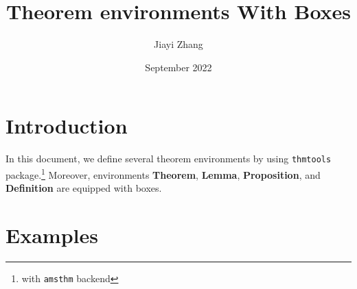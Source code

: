 \documentclass{article}
\title{Theorem environments With Boxes}
\author{Jiayi Zhang}
\date{September 2022}
\begin{document}
\maketitle

\section{Introduction}
In this document, we define several theorem environments by using 
\texttt{thmtools} package.\footnote{with \texttt{amsthm} backend} Moreover, environments \textbf{Theorem}, \textbf{Lemma}, \textbf{Proposition}, and \textbf{Definition} are equipped with boxes.

\section{Examples}

\begin{theorem}
	\lipsum[1][1-3]
\end{theorem}

\begin{lemma}
	\lipsum[1][4-5]
\end{lemma}

\begin{proposition}
	\lipsum[1][6-7]
\end{proposition}

\begin{definition}
	\lipsum[2][1-3]
\end{definition}

\begin{remark}
	\lipsum[3]
\end{remark}

\begin{example}
	\lipsum[4]
\end{example}

\begin{Proof}
	\lipsum[5]
\end{Proof}
\end{document}
